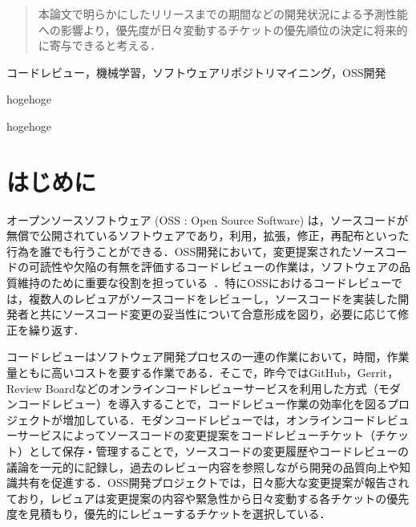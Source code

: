 \documentclass[submit]{ipsj}
\begin{document}
\begin{abstract}
本論文で明らかにしたリリースまでの期間などの開発状況による予測性能への影響より，優先度が日々変動するチケットの優先順位の決定に将来的に寄与できると考える．
\end{abstract}


\begin{jkeyword}
コードレビュー，機械学習，ソフトウェアリポジトリマイニング，OSS開発
\end{jkeyword}

\begin{eabstract}
hogehoge
\end{eabstract}

\begin{ekeyword}
hogehoge
\end{ekeyword}

\maketitle

\chapter{はじめに}

オープンソースソフトウェア (OSS : Open Source Software) は，ソースコードが無償で公開されているソフトウェアであり，利用，拡張，修正，再配布といった行為を誰でも行うことができる．OSS開発において，変更提案されたソースコードの可読性や欠陥の有無を評価するコードレビューの作業は，ソフトウェアの品質維持のために重要な役割を担っている~\cite{quality1}\cite{quality2}．特にOSSにおけるコードレビューでは，複数人のレビュアがソースコードをレビューし，ソースコードを実装した開発者と共にソースコード変更の妥当性について合意形成を図り，必要に応じて修正を繰り返す．

コードレビューはソフトウェア開発プロセスの一連の作業において，時間，作業量ともに高いコストを要する作業である\cite{cost}．そこで，昨今ではGitHub，Gerrit，Review Boardなどのオンラインコードレビューサービスを利用した方式（モダンコードレビュー\cite{quality1}）を導入することで，コードレビュー作業の効率化を図るプロジェクトが増加している．モダンコードレビューでは，オンラインコードレビューサービスによってソースコードの変更提案をコードレビューチケット（チケット）として保存・管理することで，ソースコードの変更履歴やコードレビューの議論を一元的に記録し，過去のレビュー内容を参照しながら開発の品質向上や知識共有を促進する．OSS開発プロジェクトでは，日々膨大な変更提案が報告されており，レビュアは変更提案の内容や緊急性から日々変動する各チケットの優先度を見積もり，優先的にレビューするチケットを選択している\cite{integrator}．
\end{document}
